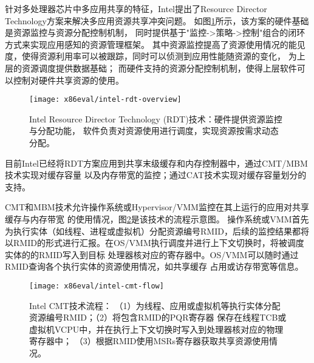 针对多处理器芯片中多应用共享的特征，Intel提出了Resource Director Technology方案来解决多应用资源共享冲突问题。
如图\ref{fig:intel-rdt-overview}所示，该方案的硬件基础是资源监控与资源分配控制机制，
同时提供基于"监控->策略->控制"组合的闭环方式来实现应用感知的资源管理框架。
其中资源监控提高了资源使用情况的能见度，使得资源利用率可以被跟踪，同时可以侦测到应用性能随资源的变化，
为上层的资源调度提供数据基础；
而硬件支持的资源分配控制机制，使得上层软件可以控制对硬件共享资源的使用。

\begin{figure}[H]
  \centering
  \texttt{[image: x86eval/intel-rdt-overview]}
  \caption[Intel Resource Director Technology (RDT) 技术示意图]{
    Intel Resource Director Technology (RDT)技术：硬件提供资源监控与分配功能，
    软件负责对资源使用进行调度，实现资源按需求动态分配。}
  \label{fig:intel-rdt-overview}
\end{figure}

目前Intel已经将RDT方案应用到共享末级缓存和内存控制器中，通过CMT/MBM技术实现对缓存容量
以及内存带宽的监控；通过CAT技术实现对缓存容量划分的支持。

CMT和MBM技术允许操作系统或Hypervisor/VMM监控在其上运行的应用对共享缓存与内存带宽
的使用情况，图\ref{fig:intel-cmt-flow}是该技术的流程示意图。
操作系统或VMM首先为执行实体（如线程、进程或虚拟机）分配资源编号RMID，后续的监控结果都将
以RMID的形式进行汇报。在OS/VMM执行调度并进行上下文切换时，将被调度实体的的RMID写入到目标
处理器核对应的寄存器中。OS/VMM可以随时通过RMID查询各个执行实体的资源使用情况，如共享缓存
占用或访存带宽等信息。
 
\begin{figure}[H]
  \centering
  \texttt{[image: x86eval/intel-cmt-flow]}
  \caption[Intel Cache Monitor Technology (CMT) 技术流程]{Intel CMT技术流程：
   （1）为线程、应用或虚拟机等执行实体分配资源编号RMID；（2）将包含RMID的PQR寄存器
   保存在线程TCB或虚拟机VCPU中，并在执行上下文切换时写入到处理器核对应的物理寄存器中；
   （3）根据RMID使用MSRs寄存器获取共享资源使用情况。}
  \label{fig:intel-cmt-flow}
\end{figure}

